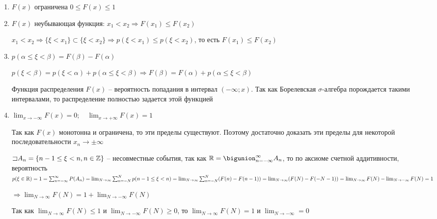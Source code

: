\documentclass[12pt]{article}
\begin{document}
    \begin{enumerate}
        \item $F(x)$ ограничена $0 \leq F(x) \leq 1$

        \item $F(x)$ неубывающая функция: $x_1 < x_2 \Longrightarrow F(x_1) \leq F(x_2)$ 

        \begin{MyProof}
            $x_1 < x_2 \Longrightarrow \{\xi < x_1\} \subset \{\xi < x_2\} \Longrightarrow p(\xi < x_1) \leq p(\xi < x_2)$, то есть $F(x_1) \leq F(x_2)$
        \end{MyProof}

        \item $p(\alpha \leq \xi < \beta) = F(\beta) - F(\alpha)$

        \begin{MyProof}
            $p(\xi < \beta) = p(\xi < \alpha) + p(\alpha \leq \xi < \beta) \Longrightarrow F(\beta) = F(\alpha) + p(\alpha \leq \xi < \beta)$
        \end{MyProof}
        
        \Notas Функция распределения $F(x)$ -- вероятность попадания в интервал $(-\infty; x)$. Так как Борелевская $\sigma$-алгебра порождается такими интервалами,
        то распределение полностью задается этой функцией

        \item $\lim_{x \to -\infty} F(x) = 0; \quad \lim_{x \to +\infty} F(x) = 1$

        \begin{MyProof}
            Так как $F(x)$ монотонна и ограничена, то эти пределы существуют. Поэтому достаточно доказать эти пределы для некоторой последовательности $x_n \to \pm \infty$

            $\mathord{\sqsupset} A_n = \{n - 1 \leq \xi < n, n \in \mathbb{Z}\}$ -- несовместные события, так как $\Real = \bigunion_{n = -\infty}^\infty A_n$, то
            по аксиоме счетной аддитивности, вероятность $p(\xi \in \mathbb{R}) = 1 = \sum_{n = -\infty}^\infty P(A_n) = \lim_{N \to \infty} \sum_{n = -N}^N p(n - 1 \leq \xi < n) = 
            \lim_{N \to \infty} \sum_{n = -N}^N (F(n) - F(n - 1)) = \lim_{N \to \infty} (F(N) - F(-N - 1)) = \lim_{N \to \infty} F(N) - \lim_{N \to -\infty} F(N) = 1$

            $\Longrightarrow \lim_{N \to \infty} F(N) = 1 + \lim_{N \to -\infty} F(N) $

            Так как $\lim_{N \to \infty} F(N) \leq 1$ и $\lim_{N \to -\infty} F(N) \geq 0$, то $\lim_{N \to \infty} F(N) = 1$ и $\lim_{N \to -\infty} = 0$
        \end{MyProof}
        

\end{enumerate}
\end{document}
